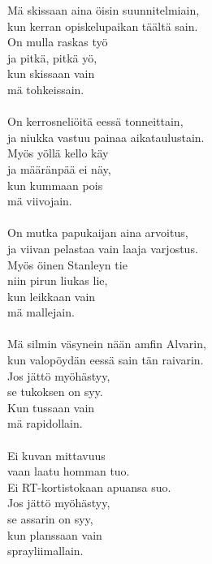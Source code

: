 
Mä skissaan aina öisin suunnitelmiain, \\ kun kerran opiskelupaikan täältä sain. \\ On mulla raskas työ \\ ja pitkä, pitkä yö, \\ kun skissaan vain \\ mä tohkeissain. \\ \hspace{10mm} \\ On kerrosneliöitä eessä tonneittain, \\ ja niukka vastuu painaa aikataulustain. \\ Myös yöllä kello käy \\ ja määränpää ei näy, \\ kun kummaan pois \\ mä viivojain. \\ \hspace{10mm} \\ On mutka papukaijan aina arvoitus, \\ ja viivan pelastaa vain laaja varjostus. \\ Myös öinen Stanleyn tie \\ niin pirun liukas lie, \\ kun leikkaan vain \\ mä mallejain. \\ \hspace{10mm} \\ Mä silmin väsynein nään amfin Alvarin, \\ kun valopöydän eessä sain tän raivarin. \\ Jos jättö myöhästyy, \\ se tukoksen on syy. \\ Kun tussaan vain \\ mä rapidollain. \\ \hspace{10mm} \\ Ei kuvan mittavuus \\ vaan laatu homman tuo. \\ Ei RT-kortistokaan apuansa suo. \\ Jos jättö myöhästyy, \\ se assarin on syy, \\ kun planssaan vain \\ sprayliimallain.